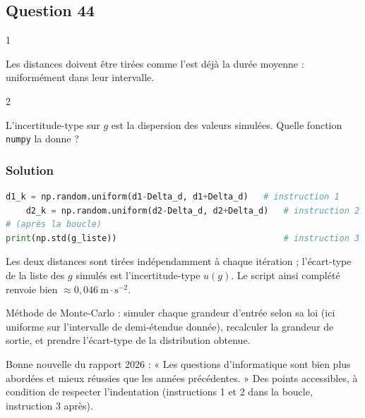 \documentclass[11pt,a4paper]{article}
\begin{document}
\hypertarget{question-44}{%
\subsection{Question 44}\label{question-44}}

\begin{indication}{1}

Les distances doivent être tirées comme l'est déjà la durée moyenne : uniformément dans leur intervalle.

\end{indication}

\begin{indication}{2}

L'incertitude-type sur \(g\) est la dispersion des valeurs simulées. Quelle fonction \texttt{numpy} la donne ?

\end{indication}

\hypertarget{solution-43}{%
\subsubsection{Solution}\label{solution-43}}

\begin{lstlisting}[language=Python]
    d1_k = np.random.uniform(d1-Delta_d, d1+Delta_d)   # instruction 1
    d2_k = np.random.uniform(d2-Delta_d, d2+Delta_d)   # instruction 2
# (après la boucle)
print(np.std(g_liste))                                 # instruction 3
\end{lstlisting}

Les deux distances sont tirées indépendamment à chaque itération ; l'écart-type de la liste des \(g\) simulés est l'incertitude-type \(u(g)\). Le script ainsi complété renvoie bien \(\approx0{,}046\ \mathrm{m\cdot s^{-2}}\).

\begin{methode}

Méthode de Monte-Carlo : simuler chaque grandeur d'entrée selon sa loi (ici uniforme sur l'intervalle de demi-étendue donnée), recalculer la grandeur de sortie, et prendre l'écart-type de la distribution obtenue.

\end{methode}

\begin{jury}

Bonne nouvelle du rapport 2026 : « Les questions d'informatique sont bien plus abordées et mieux réussies que les années précédentes. » Des points accessibles, à condition de respecter l'indentation (instructions 1 et 2 dans la boucle, instruction 3 après).

\end{jury}
\end{document}
